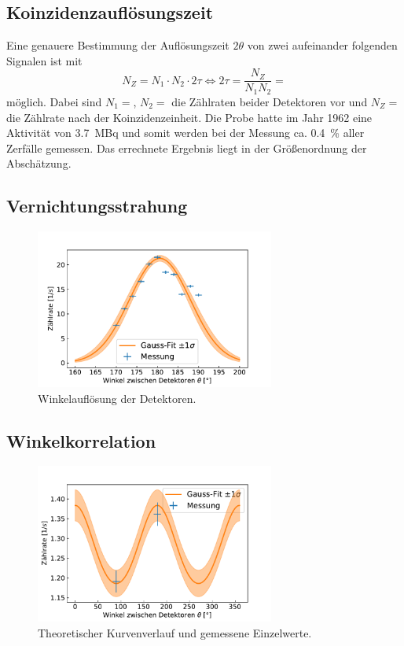 \subsection{Koinzidenzauflösungszeit}
	
	Eine genauere Bestimmung der Auflösungszeit $2\theta$ von zwei aufeinander folgenden Signalen ist mit
	\begin{equation}
		N_Z = N_1 \cdot N_2 \cdot 2\tau \Leftrightarrow 2\tau = \frac{N_Z}{N_1 N_2} = 
	\end{equation}
	möglich.
	Dabei sind $N_1 = $, $N_2 = $ die Zählraten beider Detektoren vor und $N_Z = $ die Zählrate nach der Koinzidenzeinheit.
	Die Probe hatte im Jahr 1962 eine Aktivität von \SI{3.7}{\mega\becquerel} und somit werden bei der Messung ca. \SI{0.4}{\%} aller Zerfälle gemessen.
	Das errechnete Ergebnis liegt in der Größenordnung der Abschätzung.
		
\subsection{Vernichtungsstrahung}

	\begin{figure}[ht]
		\centering
		\includegraphics[width=0.7\textwidth]{dat/vernichtung.pdf}
		\caption{Winkelauflösung der Detektoren.}
		\label{fig:vernichtung}
	\end{figure}

\subsection{Winkelkorrelation}

	\begin{figure}[ht]
		\centering
		\includegraphics[width=0.7\textwidth]{dat/theoKurve.pdf}
		\caption{Theoretischer Kurvenverlauf und gemessene Einzelwerte.}
		\label{fig:theoKurve}
	\end{figure}
